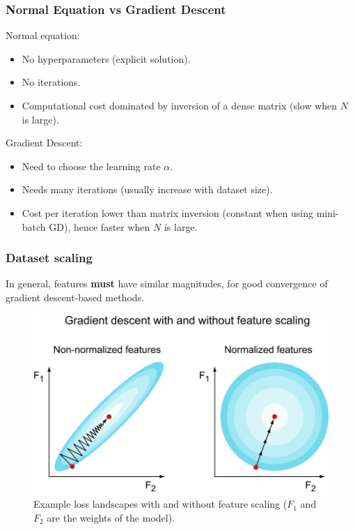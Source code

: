 \documentclass{beamer}
\begin{document}
	\begin{frame}
		\frametitle{Normal Equation vs Gradient Descent}
		Normal equation:
		\begin{itemize}
			\item No hyperparameters (explicit solution).
			\item No iterations.
			\item Computational cost dominated by inversion of a dense matrix (slow when $N$ is large).
		\end{itemize}
	
		\vspace{5mm}
	
		Gradient Descent:
		\begin{itemize}
			\item Need to choose the learning rate $\alpha$.
			\item Needs many iterations (usually increase with dataset size).
			\item Cost per iteration lower than matrix inversion (constant when using mini-batch GD), hence faster when $N$ is large.
		\end{itemize}
	\end{frame}


	\begin{frame}
		\frametitle{Dataset scaling}
		In general, features \textbf{must} have similar magnitudes, for good convergence of gradient descent-based methods.
		\vspace{1mm}
		
		\begin{figure}
			\centering
			\includegraphics[scale=0.3]{images/feature-scaling}
			\caption{Example loss landscapes with and without feature scaling ($F_1$ and $F_2$ are the weights of the model).}
		\end{figure}
	\end{frame}
\end{document}
